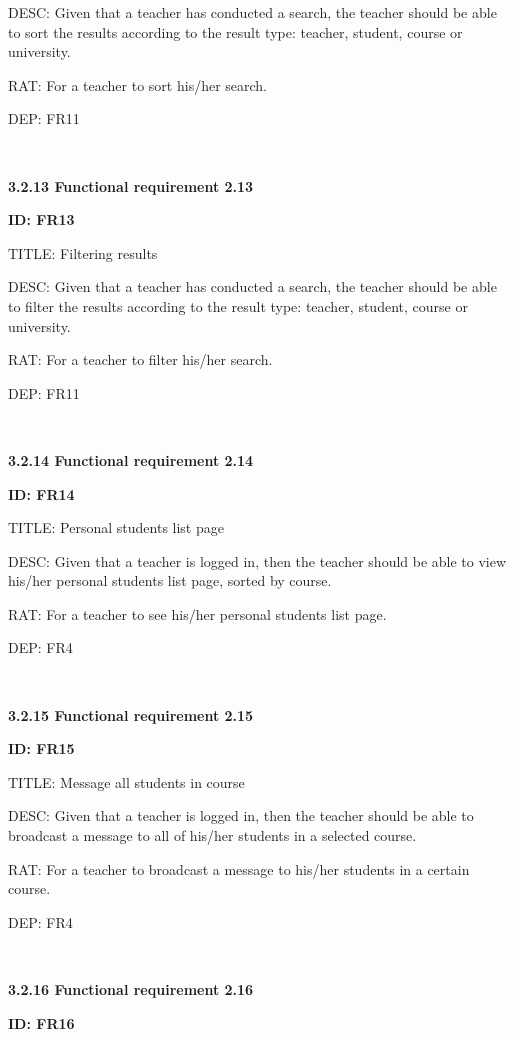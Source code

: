 \documentclass[12pt,a4paper]{article}
\begin{document}
\begin{flushleft}
        DESC: Given that a teacher has conducted a search, the teacher should be
        able to sort the results according to the result type: teacher, student, course or university.

        RAT: For a teacher to sort his/her search.

        DEP: FR11

        \

        \textbf{3.2.13 Functional requirement 2.13}

        \textbf{ID: FR13}

        TITLE: Filtering results

        DESC: Given that a teacher has conducted a search, the teacher should be
        able to filter the results according to the result type: teacher, student, course or university.

        RAT: For a teacher to filter his/her search.

        DEP: FR11

        \

        \textbf{3.2.14 Functional requirement 2.14}

        \textbf{ID: FR14}

        TITLE: Personal students list page

        DESC: Given that a teacher is logged in, then the teacher should be able
        to view his/her personal students list page, sorted by course.

        RAT: For a teacher to see his/her personal students list page.

        DEP: FR4

        \

        \textbf{3.2.15 Functional requirement 2.15}

        \textbf{ID: FR15}

        TITLE: Message all students in course

        DESC: Given that a teacher is logged in, then the teacher should be able
        to broadcast a message to all of his/her students in a selected course.

        RAT: For a teacher to broadcast a message to his/her students in a certain course.

        DEP: FR4

        \

        \textbf{3.2.16 Functional requirement 2.16}

        \textbf{ID: FR16}


\end{flushleft}
\end{document}
